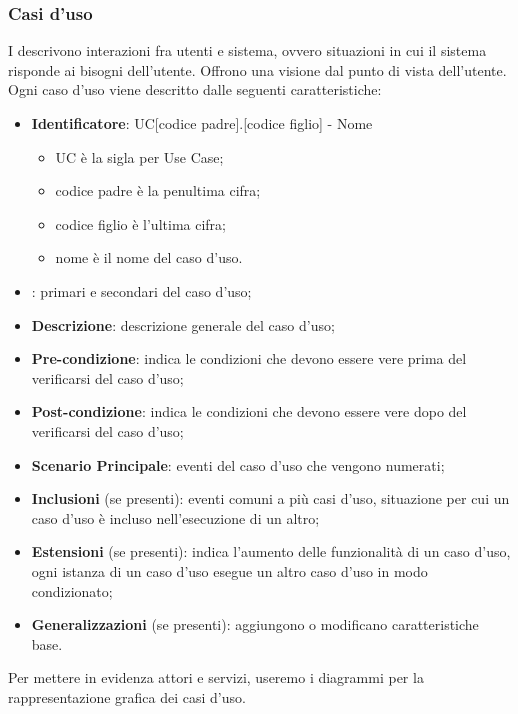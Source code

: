 \subsubsection{Casi d'uso}
I  descrivono interazioni fra utenti e sistema, ovvero situazioni in cui il sistema 
risponde ai bisogni dell'utente. Offrono una visione dal punto di vista dell'utente.\\
Ogni caso d'uso viene descritto dalle seguenti caratteristiche:
\begin{itemize}
    \item \textbf{Identificatore}: UC[codice padre].[codice figlio] - Nome 
                                \begin{itemize}
                                    \item UC è la sigla per Use Case;
                                    \item codice padre è la penultima cifra;
                                    \item codice figlio è l'ultima cifra;                                   
                                    \item nome è il nome del caso d'uso.
                                \end{itemize}
                                   
    \item \textbf{}: primari e secondari del caso d'uso;
    \item \textbf{Descrizione}: descrizione generale del caso d'uso;
    \item \textbf{Pre-condizione}: indica le condizioni che devono essere vere prima del verificarsi del caso d'uso;
    \item \textbf{Post-condizione}: indica le condizioni che devono essere vere dopo del verificarsi del caso d'uso;
    \item \textbf{Scenario Principale}: eventi del caso d'uso che vengono numerati;
    \item \textbf{Inclusioni} (se presenti): eventi comuni a più casi d'uso, situazione per cui un caso d'uso è incluso nell'esecuzione di un altro;
    \item \textbf{Estensioni} (se presenti): indica l'aumento delle funzionalità di un caso d'uso, ogni istanza di un caso d'uso esegue un altro caso d'uso in modo condizionato;
    \item \textbf{Generalizzazioni} (se presenti): aggiungono o modificano caratteristiche base.
  \end{itemize}
Per mettere in evidenza attori e servizi, useremo i diagrammi per la rappresentazione grafica dei casi d'uso.


